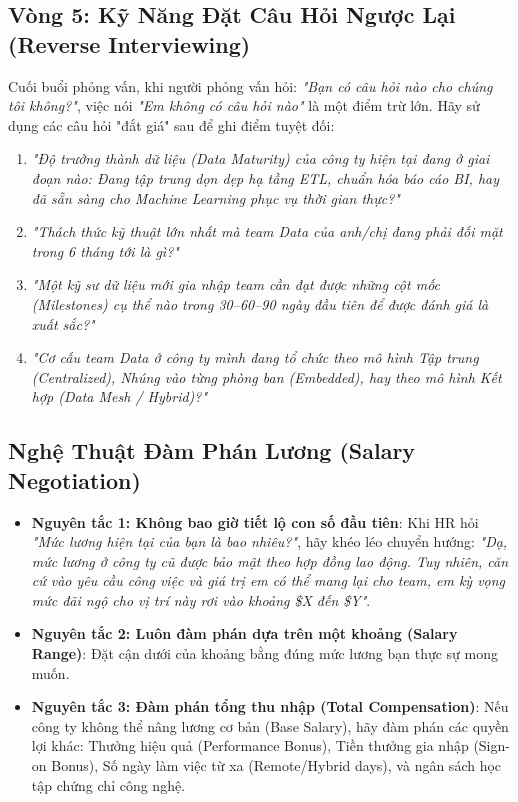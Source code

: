 \subsection{Vòng 5: Kỹ Năng Đặt Câu Hỏi Ngược Lại (Reverse Interviewing)}
Cuối buổi phỏng vấn, khi người phỏng vấn hỏi: \textit{"Bạn có câu hỏi nào cho chúng tôi không?"}, việc nói \textit{"Em không có câu hỏi nào"} là một điểm trừ lớn. Hãy sử dụng các câu hỏi "đắt giá" sau để ghi điểm tuyệt đối:
\begin{enumerate}
    \item \textit{"Độ trưởng thành dữ liệu (Data Maturity) của công ty hiện tại đang ở giai đoạn nào: Đang tập trung dọn dẹp hạ tầng ETL, chuẩn hóa báo cáo BI, hay đã sẵn sàng cho Machine Learning phục vụ thời gian thực?"}
    \item \textit{"Thách thức kỹ thuật lớn nhất mà team Data của anh/chị đang phải đối mặt trong 6 tháng tới là gì?"}
    \item \textit{"Một kỹ sư dữ liệu mới gia nhập team cần đạt được những cột mốc (Milestones) cụ thể nào trong 30--60--90 ngày đầu tiên để được đánh giá là xuất sắc?"}
    \item \textit{"Cơ cấu team Data ở công ty mình đang tổ chức theo mô hình Tập trung (Centralized), Nhúng vào từng phòng ban (Embedded), hay theo mô hình Kết hợp (Data Mesh / Hybrid)?"}
\end{enumerate}

\subsection{Nghệ Thuật Đàm Phán Lương (Salary Negotiation)}
\begin{itemize}
    \item \textbf{Nguyên tắc 1: Không bao giờ tiết lộ con số đầu tiên}: Khi HR hỏi \textit{"Mức lương hiện tại của bạn là bao nhiêu?"}, hãy khéo léo chuyển hướng: \textit{"Dạ, mức lương ở công ty cũ được bảo mật theo hợp đồng lao động. Tuy nhiên, căn cứ vào yêu cầu công việc và giá trị em có thể mang lại cho team, em kỳ vọng mức đãi ngộ cho vị trí này rơi vào khoảng \$X đến \$Y"}.
    \item \textbf{Nguyên tắc 2: Luôn đàm phán dựa trên một khoảng (Salary Range)}: Đặt cận dưới của khoảng bằng đúng mức lương bạn thực sự mong muốn.
    \item \textbf{Nguyên tắc 3: Đàm phán tổng thu nhập (Total Compensation)}: Nếu công ty không thể nâng lương cơ bản (Base Salary), hãy đàm phán các quyền lợi khác: Thưởng hiệu quả (Performance Bonus), Tiền thưởng gia nhập (Sign-on Bonus), Số ngày làm việc từ xa (Remote/Hybrid days), và ngân sách học tập chứng chỉ công nghệ.
\end{itemize}

